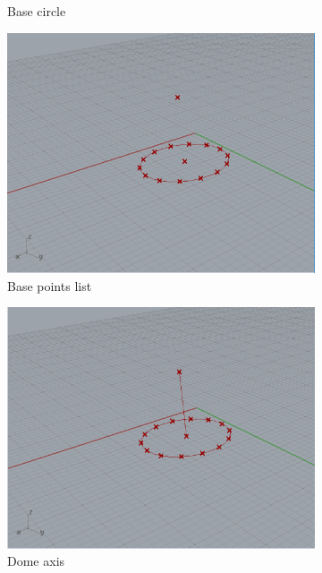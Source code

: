 \documentclass[preprint,12pt,3p]{elsarticle}
\begin{document}
\begin{figure}
\begin{subfigure}{0.3\textwidth}
  \caption{Base circle}
  \label{fig:a02s03}
\end{subfigure}


\begin{subfigure}{0.3\textwidth}
  \centering
  \includegraphics[width=.9\linewidth]{a02s04.png}
  \caption{Base points list}
  \label{fig:a02s04}
\end{subfigure}
\begin{subfigure}{0.3\textwidth}
  \centering
  \includegraphics[width=.9\linewidth]{a02s05.png}
  \caption{Dome axis}
  \label{fig:a02s05}
\end{subfigure}
\begin{subfigure}{0.3\textwidth}
  \centering

\end{subfigure}
\end{figure}
\end{document}
